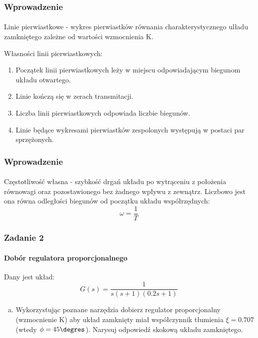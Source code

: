 \documentclass{beamer}
\begin{document}
\begin{frame}\frametitle{Wprowadzenie}\framesubtitle{}
	Linie pierwiastkowe - wykres pierwiastków równania charakterystycznego ulładu zamkniętego zależne od wartości wzmocnienia K.
	
	Własności linii pierwiastkowych:
	\begin{enumerate}
		\item Początek linii pierwiastkowych leży w miejscu odpowiadającym biegunom układu otwartego.
		
		\item Linie kończą się w zerach transmitacji.
		
		\item Liczba linii pierwiastkowych odpowiada liczbie biegunów.
		
		\item Linie będące wykresami pierwiastków zespolonych występują w postaci par sprzężonych.
	\end{enumerate}
\end{frame}

\begin{frame}\frametitle{Wprowadzenie}\framesubtitle{}
	Częstotliwość własna - szybkość drgań układu po wytrąceniu z położenia równowagi oraz pozostawionego bez żadnego wpływu z zewnątrz. Liczbowo jest ona równa odległości biegunów od początku układu współrzędnych:
	\[
		\omega = \frac{1}{T}
	\]
\end{frame}



\begin{frame}\frametitle{Zadanie 2}\framesubtitle{Dobór regulatora proporcjonalnego}
	Dany jest układ:
	\[
	G(s) = \frac{1}{s(s+1)(0.2s+1)}
	\]
    \begin{enumerate}[a)]
        \item Wykorzystując poznane narzędzia dobierz regulator proporcjonalny (wzmocnienie K) aby układ zamknięty miał współczynnik tłumienia $\xi = 0.707$ (wtedy $\phi = 45\degres$). Narysuj odpowiedź skokową układu zamkniętego.
        
        
    \end{enumerate}
\end{frame}
\end{document}
